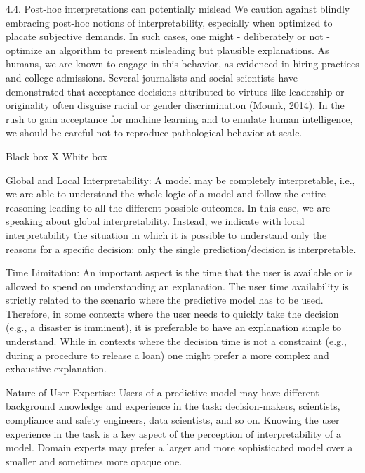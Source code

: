 

4.4. Post-hoc interpretations can potentially mislead
We caution against blindly embracing post-hoc notions of
interpretability, especially when optimized to placate subjective demands. In such cases, one might - deliberately or
not - optimize an algorithm to present misleading but plausible explanations. As humans, we are known to engage in
this behavior, as evidenced in hiring practices and college
admissions. Several journalists and social scientists have
demonstrated that acceptance decisions attributed to virtues
like leadership or originality often disguise racial or gender
discrimination (Mounk, 2014). In the rush to gain acceptance for machine learning and to emulate human intelligence, we should be careful not to reproduce pathological
behavior at scale.

\cite{Guidotti2018}

Black box X White box

Global and Local Interpretability: A model may be completely interpretable, i.e., we are able to
understand the whole logic of a model and follow the entire reasoning leading to all the different
possible outcomes. In this case, we are speaking about global interpretability. Instead, we indicate
with local interpretability the situation in which it is possible to understand only the reasons for
a specific decision: only the single prediction/decision is interpretable.

Time Limitation: An important aspect is the time that the user is available or is allowed to spend
on understanding an explanation. The user time availability is strictly related to the scenario where
the predictive model has to be used. Therefore, in some contexts where the user needs to quickly
take the decision (e.g., a disaster is imminent), it is preferable to have an explanation simple to
understand. While in contexts where the decision time is not a constraint (e.g., during a procedure
to release a loan) one might prefer a more complex and exhaustive explanation.

Nature of User Expertise: Users of a predictive model may have different background knowledge
and experience in the task: decision-makers, scientists, compliance and safety engineers, data scientists, and so on. Knowing the user experience in the task is a key aspect of the perception of
interpretability of a model. Domain experts may prefer a larger and more sophisticated model over
a smaller and sometimes more opaque one.

